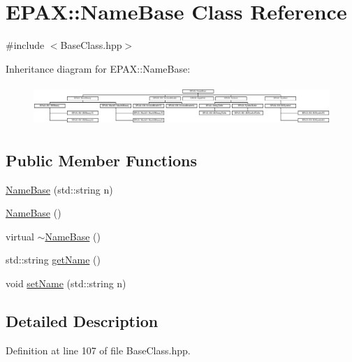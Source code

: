 \hypertarget{class_e_p_a_x_1_1_name_base}{\section{\-E\-P\-A\-X\-:\-:\-Name\-Base \-Class \-Reference}
\label{class_e_p_a_x_1_1_name_base}
}


{\ttfamily \#include $<$\-Base\-Class.\-hpp$>$}

\-Inheritance diagram for \-E\-P\-A\-X\-:\-:\-Name\-Base\-:\begin{figure}[H]
\begin{center}
\leavevmode
\includegraphics[height=1.547817cm]{class_e_p_a_x_1_1_name_base}
\end{center}
\end{figure}
\subsection*{\-Public \-Member \-Functions}
\begin{DoxyCompactItemize}
\item 
\hyperlink{class_e_p_a_x_1_1_name_base_acdbcff79c1f15eaafdf9dd65a48bc22b}{\-Name\-Base} (std\-::string n)
\item 
\hyperlink{class_e_p_a_x_1_1_name_base_a3b74b295e3e77e0be7fefa482e4452d4}{\-Name\-Base} ()
\item 
virtual \hyperlink{class_e_p_a_x_1_1_name_base_a5de3a56d6fc0d30270b0a32ad81f3c30}{$\sim$\-Name\-Base} ()
\item 
std\-::string \hyperlink{class_e_p_a_x_1_1_name_base_ac45bad0887b6a3283cc76047f91f7708}{get\-Name} ()
\item 
void \hyperlink{class_e_p_a_x_1_1_name_base_a0249989dc06f3563cdee08435856d15d}{set\-Name} (std\-::string n)
\end{DoxyCompactItemize}


\subsection{\-Detailed \-Description}


\-Definition at line 107 of file \-Base\-Class.\-hpp.



